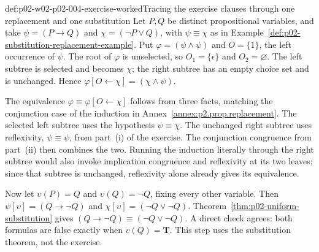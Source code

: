 \begin{hbexample}{def:p02-w02-p02-004-exercise-worked}{Tracing the exercise clauses through one replacement and one substitution}
Let \(P,Q\) be distinct propositional variables, and take
\(\psi=(P\to Q)\) and \(\chi=(\neg P\lor Q)\), with \(\psi\equiv\chi\) as in
Example~\ref{def:p02-substitution-replacement-example}.  Put
\(\varphi=(\psi\land\psi)\) and \(O=\{1\}\), the left occurrence of
\(\psi\).  The root of \(\varphi\) is unselected, so
\(O_1=\{\epsilon\}\) and \(O_2=\varnothing\).  The left subtree is selected
and becomes \(\chi\); the right subtree has an empty choice set and is
unchanged.  Hence \(\varphi[O\leftarrow\chi]=(\chi\land\psi)\).

The equivalence \(\varphi\equiv\varphi[O\leftarrow\chi]\) follows from three
facts, matching the conjunction case of the induction in
Annex~\ref{annex:p2.prop.replacement}.  The selected left subtree uses the
hypothesis \(\psi\equiv\chi\).  The unchanged right subtree uses reflexivity,
\(\psi\equiv\psi\), from part~(i) of the exercise.  The conjunction
congruence from part~(ii) then combines the two.  Running the induction
literally through the right subtree would also invoke implication congruence
and reflexivity at its two leaves; since that subtree is unchanged,
reflexivity alone already gives its equivalence.

Now let \(\upsilon(P)=Q\) and \(\upsilon(Q)=\neg Q\), fixing every other
variable.  Then \(\psi[\upsilon]=(Q\to\neg Q)\) and
\(\chi[\upsilon]=(\neg Q\lor\neg Q)\).
Theorem~\ref{thm:p02-uniform-substitution} gives
\((Q\to\neg Q)\equiv(\neg Q\lor\neg Q)\).  A direct check agrees: both
formulas are false exactly when \(v(Q)=\mathbf T\).  This step uses the
substitution theorem, not the exercise.
\end{hbexample}

